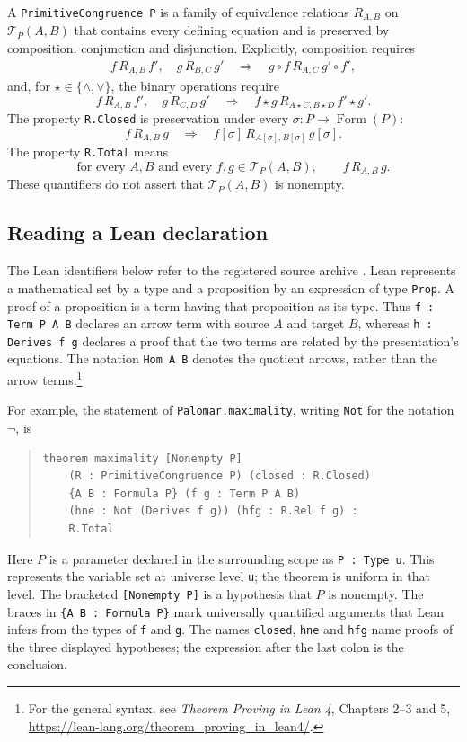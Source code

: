 \documentclass[11pt]{article}
\newcommand{\FormulaSet}{\operatorname{Form}}
\begin{document}
A \texttt{PrimitiveCongruence P} is a family of equivalence relations
$R_{A,B}$ on $\mathcal T_P(A,B)$ that contains every defining equation
and is preserved by composition, conjunction and disjunction.
Explicitly, composition requires
\[
 \begin{gathered}
 f\,R_{A,B}\,f',\quad g\,R_{B,C}\,g'
 \quad\Longrightarrow\quad
 g\circ f\,R_{A,C}\,g'\circ f',
 \end{gathered}
\]
and, for $\star\in\{\wedge,\vee\}$, the binary operations require
\[
 f\,R_{A,B}\,f',\quad g\,R_{C,D}\,g'
 \quad\Longrightarrow\quad
 f\star g\,R_{A\star C,B\star D}\,f'\star g'.
\]
The property \texttt{R.Closed} is preservation under every
$\sigma:P\to\FormulaSet(P)$:
\[
 f\,R_{A,B}\,g
 \quad\Longrightarrow\quad
 f[\sigma]\,R_{A[\sigma],B[\sigma]}\,g[\sigma].
\]
The property \texttt{R.Total} means
\[
 \text{for every }A,B\text{ and every }f,g\in\mathcal T_P(A,B),
 \qquad f\,R_{A,B}\,g.
\]
These quantifiers do not assert that $\mathcal T_P(A,B)$ is nonempty.

\subsection{Reading a Lean declaration}\label{app:reading-lean}

The Lean identifiers below refer to the registered source archive
\cite{palomar-2026-10-30-000014-v2}.
Lean represents a mathematical set by a type and a proposition by
an expression of type \texttt{Prop}. A proof of a proposition is a
term having that proposition as its type. Thus
\texttt{f : Term P A B} declares an arrow term with source $A$
and target $B$, whereas \texttt{h : Derives f g} declares a proof
that the two terms are related by the presentation's equations.
The notation \texttt{Hom A B} denotes the quotient arrows, rather
than the arrow terms.\footnote{\raggedright For the general syntax, see
\emph{Theorem Proving in Lean 4}, Chapters 2--3 and 5,
\url{https://lean-lang.org/theorem_proving_in_lean4/}.}

For example, the statement of \href{https://github.com/flengyel/Dosen-Petric-Maximality/blob/5dbee39bea09539bd130f729e82636419f71f920/DosenPetric/PalomarMaximality.lean\#L17}{\texttt{Palomar.maximality}},
writing \texttt{Not} for the notation $\neg$, is
\begin{quote}
\begin{verbatim}
theorem maximality [Nonempty P]
    (R : PrimitiveCongruence P) (closed : R.Closed)
    {A B : Formula P} (f g : Term P A B)
    (hne : Not (Derives f g)) (hfg : R.Rel f g) :
    R.Total
\end{verbatim}
\end{quote}
Here $P$ is a parameter declared in the surrounding scope as
\texttt{P : Type u}. This represents the variable set at universe
level \texttt{u}; the theorem is uniform in that level.
The bracketed \texttt{[Nonempty P]} is a hypothesis that $P$ is
nonempty. The braces in \texttt{\{A B : Formula P\}} mark
universally quantified arguments that Lean infers from the types
of \texttt{f} and \texttt{g}.
The names \texttt{closed}, \texttt{hne} and \texttt{hfg} name
proofs of the three displayed hypotheses; the expression after
the last colon is the conclusion.
\end{document}
